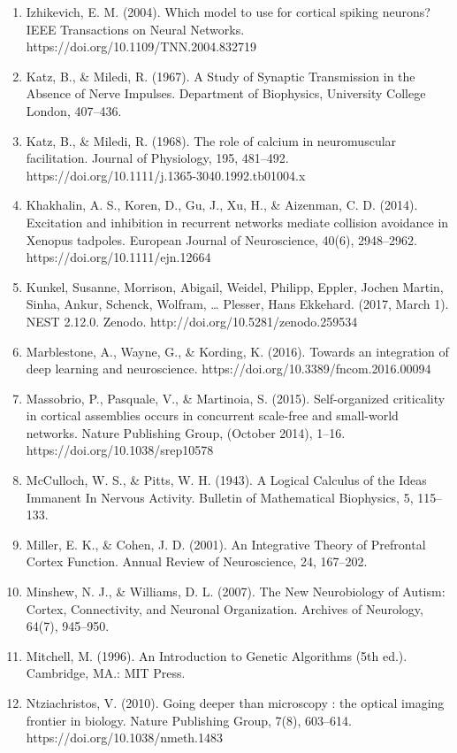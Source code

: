\documentclass[11pt]{article}
\begin{document}
\begin{enumerate}
\item Izhikevich, E. M. (2004). Which model to use for cortical spiking neurons? IEEE Transactions on Neural Networks. https://doi.org/10.1109/TNN.2004.832719
\item Katz, B., \& Miledi, R. (1967). A Study of Synaptic Transmission in the Absence of Nerve Impulses. Department of Biophysics, University College London, 407–436.
\item Katz, B., \& Miledi, R. (1968). The role of calcium in neuromuscular facilitation. Journal of Physiology, 195, 481–492. https://doi.org/10.1111/j.1365-3040.1992.tb01004.x
\item Khakhalin, A. S., Koren, D., Gu, J., Xu, H., \& Aizenman, C. D. (2014). Excitation and inhibition in recurrent networks mediate collision avoidance in Xenopus tadpoles. European Journal of Neuroscience, 40(6), 2948–2962. https://doi.org/10.1111/ejn.12664
\item Kunkel, Susanne, Morrison, Abigail, Weidel, Philipp, Eppler, Jochen Martin, Sinha, Ankur, Schenck, Wolfram, … Plesser, Hans Ekkehard. (2017, March 1). NEST 2.12.0. Zenodo. http://doi.org/10.5281/zenodo.259534
\item Marblestone, A., Wayne, G., \& Kording, K. (2016). Towards an integration of deep learning and neuroscience. https://doi.org/10.3389/fncom.2016.00094
\item Massobrio, P., Pasquale, V., \& Martinoia, S. (2015). Self-organized criticality in cortical assemblies occurs in concurrent scale-free and small-world networks. Nature Publishing Group, (October 2014), 1–16. https://doi.org/10.1038/srep10578
\item McCulloch, W. S., \& Pitts, W. H. (1943). A Logical Calculus of the Ideas Immanent In Nervous Activity. Bulletin of Mathematical Biophysics, 5, 115–133.
\item Miller, E. K., \& Cohen, J. D. (2001). An Integrative Theory of Prefrontal Cortex Function. Annual Review of Neuroscience, 24, 167–202.
\item Minshew, N. J., \& Williams, D. L. (2007). The New Neurobiology of Autism: Cortex, Connectivity, and Neuronal Organization. Archives of Neurology, 64(7), 945–950.
\item Mitchell, M. (1996). An Introduction to Genetic Algorithms (5th ed.). Cambridge, MA.: MIT Press.
\item Ntziachristos, V. (2010). Going deeper than microscopy : the optical imaging frontier in biology. Nature Publishing Group, 7(8), 603–614. https://doi.org/10.1038/nmeth.1483

\end{enumerate}
\end{document}
